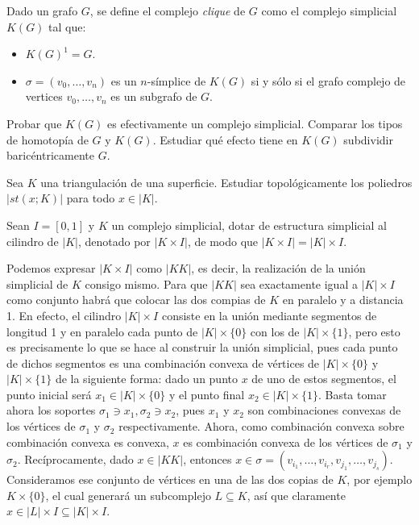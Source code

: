 \documentclass[twoside]{article}
\begin{document}
\newpage

\begin{ejercicio}{1.10}
Dado un grafo $G$, se define el complejo \emph{clique} de $G$ como el complejo simplicial $K(G)$ tal que:
\begin{itemize}
\item $K(G)^1 = G$.
\item $σ = (v_0,\dots,v_n)$ es un $n$-símplice de $K(G)$ si y sólo si el grafo complejo de vertices $v_0,\dots,v_n$ es un subgrafo de $G$.
\end{itemize}
Probar que $K(G)$ es efectivamente un complejo simplicial.
Comparar los tipos de homotopía de $G$ y $K(G)$.
Estudiar qué efecto tiene en $K(G)$ subdividir baricéntricamente $G$.
\end{ejercicio}
\begin{solucion}
\end{solucion}

\newpage

\begin{ejercicio}{1.11}
Sea $K$ una triangulación de una superficie.
Estudiar topológicamente los poliedros $|st(x;K)|$ para todo $x \in |K|$.
\end{ejercicio}
\begin{solucion}
\end{solucion}

\newpage

\begin{ejercicio}{1.12}
Sean $I = [0,1]$ y $K$ un complejo simplicial, dotar de estructura simplicial al cilindro de $|K|$, denotado por $|K \times I|$, de modo que $|K \times I| = |K| \times I$.
\end{ejercicio}
\begin{solucion}
Podemos expresar $|K\times I|$ como $|KK|$, es decir, la realización de la unión simplicial de $K$ consigo mismo. Para que $|KK|$ sea exactamente igual a $|K|\times I$ como conjunto habrá que colocar las dos compias de $K$ en paralelo y a distancia 1. En efecto, el cilindro $|K|\times I$ consiste en la unión mediante segmentos de longitud 1 y en paralelo cada punto de $|K|\times\{0\}$ con los de $|K|\times\{1\}$, pero esto es precisamente lo que se hace al construir la unión simplicial, pues cada punto de dichos segmentos es una combinación convexa de vértices de $|K|\times\{0\}$ y $|K|\times\{1\}$ de la siguiente forma: dado un punto $x$ de uno de estos segmentos, el punto inicial será $x_1\in |K|\times\{0\}$ y el punto final $x_2\in |K|\times\{1\}$. Basta tomar ahora los soportes $\sigma_1\ni x_1,\sigma_2\ni x_2$, pues $x_1$ y $x_2$ son combinaciones convexas de los vértices de $\sigma_1$ y $\sigma_2$ respectivamente. Ahora, como combinación convexa sobre combinación convexa es convexa, $x$ es combinación convexa de los vértices de $\sigma_1$ y $\sigma_2$. Recíprocamente, dado $x\in |KK|$, entonces $x\in \sigma=(v_{i_1},\dots, v_{i_r},v_{j_1},\dots,v_{j_s})$. Consideramos ese conjunto de vértices en una de las dos copias de $K$, por ejemplo $K\times\{0\}$, el cual generará un subcomplejo  $L\subseteq K$, así que claramente $x\in |L|\times I\subseteq |K|\times I$.
\end{solucion}
\end{document}
